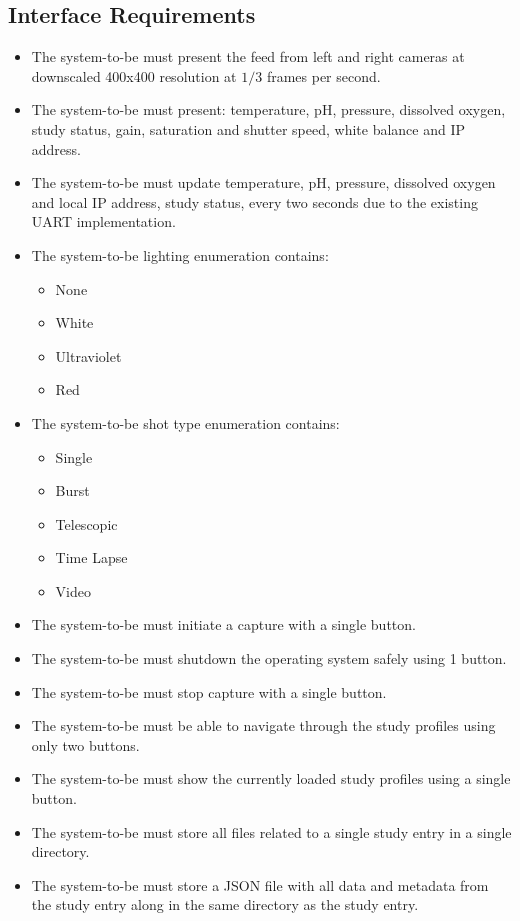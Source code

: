 \subsection{Interface Requirements}
\begin{itemize}
	\item The system-to-be must present the feed from left and right cameras at downscaled 400x400 resolution at $1/3$ frames per second.
	\item The system-to-be must present: temperature, pH, pressure, dissolved oxygen, study status, gain, saturation and shutter speed, white balance and IP address.
	\item The system-to-be must update temperature, pH, pressure, dissolved oxygen and local IP address, study status, every two seconds due to the existing UART implementation.
	\item The system-to-be lighting enumeration contains:
	      \begin{itemize}
		      \item None
		      \item White
		      \item Ultraviolet
		      \item Red
	      \end{itemize}
	\item The system-to-be shot type enumeration contains:
	      \begin{itemize}
		      \item Single
		      \item Burst
		      \item Telescopic
		      \item Time Lapse
		      \item Video
	      \end{itemize}
	\item The system-to-be must initiate a capture with a single button.
	\item The system-to-be must shutdown the operating system safely using 1 button.
	\item The system-to-be must stop capture with a single button.
	\item The system-to-be must be able to navigate through the study profiles using only two buttons.
	\item The system-to-be must show the currently loaded study profiles using a single button.
	\item The system-to-be must store all files related to a single study entry in a single directory.
	\item The system-to-be must store a JSON file with all data and metadata from the study entry along in the same directory as the study entry.

\end{itemize}
